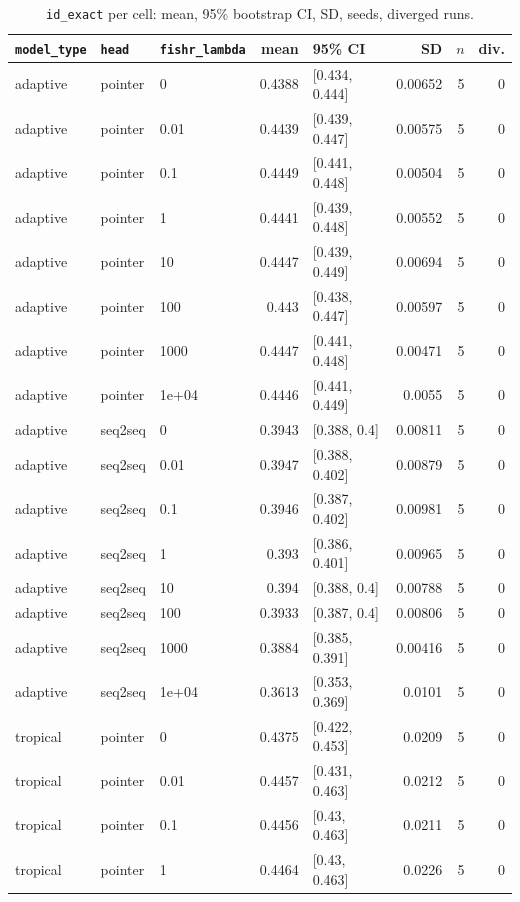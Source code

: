 \documentclass[10pt]{article}
\begin{document}
{\small
\begin{longtable}{lllrlrrr}
\caption{\texttt{id\_exact} per cell: mean, 95\% bootstrap CI, SD, seeds, diverged runs.}\label{tab:summary-id_exact}\\
\toprule
\texttt{model\_type} & \texttt{head} & \texttt{fishr\_lambda} & mean & 95\% CI & SD & $n$ & div.\\
\midrule
\endhead
adaptive & pointer & 0 & 0.4388 & [0.434, 0.444] & 0.00652 & 5 & 0\\
adaptive & pointer & 0.01 & 0.4439 & [0.439, 0.447] & 0.00575 & 5 & 0\\
adaptive & pointer & 0.1 & 0.4449 & [0.441, 0.448] & 0.00504 & 5 & 0\\
adaptive & pointer & 1 & 0.4441 & [0.439, 0.448] & 0.00552 & 5 & 0\\
adaptive & pointer & 10 & 0.4447 & [0.439, 0.449] & 0.00694 & 5 & 0\\
adaptive & pointer & 100 & 0.443 & [0.438, 0.447] & 0.00597 & 5 & 0\\
adaptive & pointer & 1000 & 0.4447 & [0.441, 0.448] & 0.00471 & 5 & 0\\
adaptive & pointer & 1e+04 & 0.4446 & [0.441, 0.449] & 0.0055 & 5 & 0\\
adaptive & seq2seq & 0 & 0.3943 & [0.388, 0.4] & 0.00811 & 5 & 0\\
adaptive & seq2seq & 0.01 & 0.3947 & [0.388, 0.402] & 0.00879 & 5 & 0\\
adaptive & seq2seq & 0.1 & 0.3946 & [0.387, 0.402] & 0.00981 & 5 & 0\\
adaptive & seq2seq & 1 & 0.393 & [0.386, 0.401] & 0.00965 & 5 & 0\\
adaptive & seq2seq & 10 & 0.394 & [0.388, 0.4] & 0.00788 & 5 & 0\\
adaptive & seq2seq & 100 & 0.3933 & [0.387, 0.4] & 0.00806 & 5 & 0\\
adaptive & seq2seq & 1000 & 0.3884 & [0.385, 0.391] & 0.00416 & 5 & 0\\
adaptive & seq2seq & 1e+04 & 0.3613 & [0.353, 0.369] & 0.0101 & 5 & 0\\
tropical & pointer & 0 & 0.4375 & [0.422, 0.453] & 0.0209 & 5 & 0\\
tropical & pointer & 0.01 & 0.4457 & [0.431, 0.463] & 0.0212 & 5 & 0\\
tropical & pointer & 0.1 & 0.4456 & [0.43, 0.463] & 0.0211 & 5 & 0\\
tropical & pointer & 1 & 0.4464 & [0.43, 0.463] & 0.0226 & 5 & 0\\

\end{longtable}}
\end{document}
